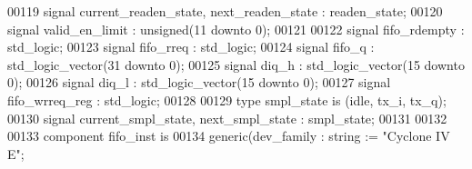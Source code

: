 \begin{DoxyCode}
00119   \textcolor{keywordflow}{signal} \textcolor{vhdlchar}{current_readen_state}\textcolor{vhdlchar}{,} \textcolor{vhdlchar}{next_readen_state} \textcolor{vhdlchar}{:}  \textcolor{vhdlchar}{readen_state}; 
00120   \textcolor{keywordflow}{signal} \textcolor{vhdlchar}{valid_en_limit}      \textcolor{vhdlchar}{:} \textcolor{comment}{unsigned}\textcolor{vhdlchar}{(}\textcolor{vhdllogic}{}\textcolor{vhdllogic}{11} \textcolor{keywordflow}{downto} \textcolor{vhdllogic}{}\textcolor{vhdllogic}{0}\textcolor{vhdlchar}{)};
00121   
00122   \textcolor{keywordflow}{signal} \textcolor{vhdlchar}{fifo_rdempty}   \textcolor{vhdlchar}{:} \textcolor{comment}{std\_logic};
00123   \textcolor{keywordflow}{signal} \textcolor{vhdlchar}{fifo_rreq}      \textcolor{vhdlchar}{:} \textcolor{comment}{std\_logic};
00124   \textcolor{keywordflow}{signal} \textcolor{vhdlchar}{fifo_q}         \textcolor{vhdlchar}{:} \textcolor{comment}{std\_logic\_vector}\textcolor{vhdlchar}{(}\textcolor{vhdllogic}{}\textcolor{vhdllogic}{31} \textcolor{keywordflow}{downto} \textcolor{vhdllogic}{}\textcolor{vhdllogic}{0}\textcolor{vhdlchar}{)};
00125   \textcolor{keywordflow}{signal} \textcolor{vhdlchar}{diq_h}              \textcolor{vhdlchar}{:} \textcolor{comment}{std\_logic\_vector}\textcolor{vhdlchar}{(}\textcolor{vhdllogic}{}\textcolor{vhdllogic}{15} \textcolor{keywordflow}{downto} \textcolor{vhdllogic}{}\textcolor{vhdllogic}{0}\textcolor{vhdlchar}{)};
00126   \textcolor{keywordflow}{signal} \textcolor{vhdlchar}{diq_l}              \textcolor{vhdlchar}{:} \textcolor{comment}{std\_logic\_vector}\textcolor{vhdlchar}{(}\textcolor{vhdllogic}{}\textcolor{vhdllogic}{15} \textcolor{keywordflow}{downto} \textcolor{vhdllogic}{}\textcolor{vhdllogic}{0}\textcolor{vhdlchar}{)};
00127   \textcolor{keywordflow}{signal} \textcolor{vhdlchar}{fifo_wrreq_reg}     \textcolor{vhdlchar}{:} \textcolor{comment}{std\_logic};
00128   
00129   \textcolor{keywordflow}{type} \textcolor{vhdlchar}{smpl_state} \textcolor{keywordflow}{is} \textcolor{vhdlchar}{(}\textcolor{vhdlchar}{idle}\textcolor{vhdlchar}{,} \textcolor{vhdlchar}{tx\_i}\textcolor{vhdlchar}{,} \textcolor{vhdlchar}{tx\_q}\textcolor{vhdlchar}{)};
00130   \textcolor{keywordflow}{signal} \textcolor{vhdlchar}{current_smpl_state}\textcolor{vhdlchar}{,} \textcolor{vhdlchar}{next_smpl_state} \textcolor{vhdlchar}{:}  \textcolor{vhdlchar}{smpl_state}; 
00131 
00132 
00133 \textcolor{keywordflow}{component} fifo_inst \textcolor{keywordflow}{is}
00134   \textcolor{keywordflow}{generic}(dev_family         : \textcolor{comment}{string}  := \textcolor{keyword}{"Cyclone IV E"};

\end{DoxyCode}

